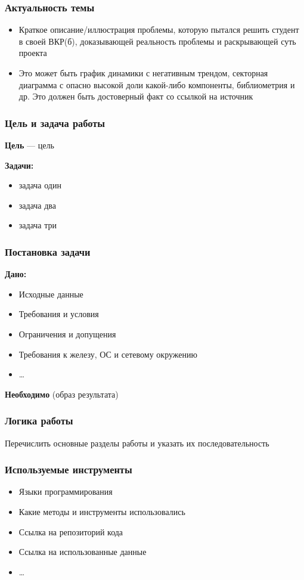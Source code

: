\documentclass[pdf, hyperref={unicode}, aspectratio=169]{beamer}
\begin{document}
\frame{\titlepage}

\begin{frame}
\frametitle{Актуальность темы}

\begin{itemize}
	\item Краткое описание/иллюстрация проблемы, которую пытался решить студент в своей ВКР(б), доказывающей реальность проблемы и раскрывающей суть проекта
	\item Это может быть график динамики с негативным трендом, секторная диаграмма с опасно высокой доли какой-либо компоненты, библиометрия и др. Это должен быть достоверный факт со ссылкой на источник
\end{itemize}
\end{frame}


\begin{frame}
\frametitle{Цель и задача работы}

\textbf{Цель} --- \alert{цель}

\textbf{Задачи:}
\begin{itemize}
	\item задача один
	\item задача два
	\item задача три
\end{itemize}
\end{frame}


\begin{frame}
\frametitle{Постановка задачи}

\textbf{Дано:}
\begin{itemize}
	\item Исходные данные
	\item Требования и условия
	\item Ограничения и допущения
	\item Требования к железу, ОС и сетевому окружению
	\item …
\end{itemize}

\textbf{Необходимо} (образ результата)
\end{frame}


\begin{frame}
\frametitle{Логика работы}

Перечислить основные разделы работы и указать их последовательность
\end{frame}


\begin{frame}
\frametitle{Используемые инструменты}

\begin{itemize}
	\item Языки программирования
	\item Какие методы и инструменты использовались
	\item Ссылка на репозиторий кода
	\item Ссылка на использованные данные
	\item …
\end{itemize}
\end{frame}
\end{document}

